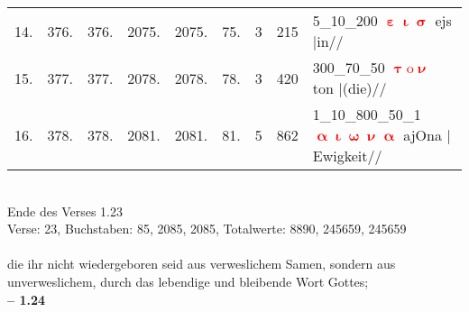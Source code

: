 \documentclass[a4paper,10pt,landscape]{article}
\begin{document}
\begin{tabular}{rrrrrrrrp{120mm}}
14.&376.&376.&2075.&2075.&75.&3&215&5\_10\_200 \textcolor{red}{$\boldsymbol{\upepsilon\upiota\upsigma}$} ejs $|$in//\\
15.&377.&377.&2078.&2078.&78.&3&420&300\_70\_50 \textcolor{red}{$\boldsymbol{\uptau\mathrm{o}\upnu}$} ton $|$(die)//\\
16.&378.&378.&2081.&2081.&81.&5&862&1\_10\_800\_50\_1 \textcolor{red}{$\boldsymbol{\upalpha\upiota\upomega\upnu\upalpha}$} ajOna $|$Ewigkeit//\\
\end{tabular}\medskip \\
Ende des Verses 1.23\\
Verse: 23, Buchstaben: 85, 2085, 2085, Totalwerte: 8890, 245659, 245659\\
\\
die ihr nicht wiedergeboren seid aus verweslichem Samen, sondern aus unverweslichem, durch das lebendige und bleibende Wort Gottes;\\
\newpage 
{\bf -- 1.24}\\
\medskip \\
\end{document}
